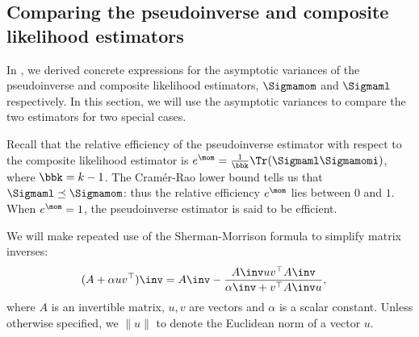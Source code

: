 \subsection{Comparing the pseudoinverse and composite likelihood estimators}
\label{app:rel-eff}

In , we derived concrete expressions for the
asymptotic variances of the pseudoinverse and composite likelihood
estimators, $\Sigmamom$ and $\Sigmaml$ respectively. 
In this section, we will use the asymptotic variances to compare the two
estimators for two special cases.

Recall that the relative efficiency of the pseudoinverse estimator with respect to the composite likelihood estimator is
$e^\mom
= \frac{1}{\bbk} \Tr(\Sigmaml \Sigmamomi)$, where $\bbk = k-1$. The
Cram\'{e}r-Rao lower bound tells us that $\Sigmaml \preceq \Sigmamom$:
thus the relative efficiency $e^\mom$ lies between $0$ and $1$. When
$e^\mom = 1$, the pseudoinverse estimator is said to be efficient.

We will make repeated use of the Sherman-Morrison formula to simplify
matrix inverses:
\begin{align*}
  (A + \alpha uv^\top)\inv &= A\inv - \frac{A\inv uv^\top A\inv}{\alpha\inv + v^\top A\inv u},
\end{align*}
where $A$ is an invertible matrix, $u, v$ are vectors and $\alpha$ is
a scalar constant. Unless otherwise specified, we $\|u\|$ to denote the
Euclidean norm of a vector $u$.



